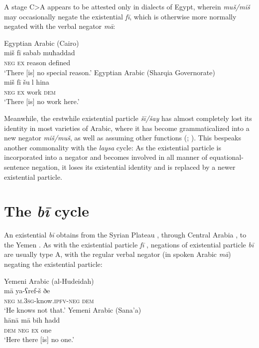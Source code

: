 \documentclass[output=paper]{langsci/langscibook}
\begin{document}
A stage C>A appears to be attested only in dialects of Egypt, wherein \textit{muš/miš} may occasionally negate the existential \textit{fī}, which is otherwise more normally negated with the verbal negator \textit{mā}:

\ea \label{ex:WiAR-21}
  \ea Egyptian Arabic (Cairo)\\
  	\gll miš fī sabab muħaddad\\
  	\textsc{neg} \textsc{ex} reason defined\\
  	\glt ‘There [is] no special reason.’ \citep[89]{doss2008a}
  \ex Egyptian Arabic (Sharqia Governorate)\\
  	\gll miš fī šul hina\\
  	\textsc{neg} \textsc{ex} work \textsc{dem}\\
  	\glt ‘There [is] no work here.’ \citep[71]{h2011a}
\z \z



Meanwhile, the erstwhile existential particle \textit{šī/šay} has almost completely lost its identity in most varieties of Arabic, where it has become grammaticalized into a new negator \textit{miš/muš}, as well as assuming other functions (\citealp[chpt. 3]{wilmsen2014a}; \citealp{wilmsen2017a}). This bespeaks another commonality with the \textit{laysa} cycle: As the existential particle is incorporated into a negator and becomes involved in all manner of equational-sentence negation, it loses its existential identity and is replaced by a newer existential particle. 


\section{The \textit{bī} cycle\footnotemark} \label{s:WiAR-4}


An existential \textit{bī} obtains from the Syrian Plateau \citep[346–348, map 336]{behnstedt1997a}, through Central Arabia \citep[44-45]{ingham1994a}, to the Yemen \citep[346, map 136]{behnstedt2016a}. As with the existential particle \textit{fī} \citep[7]{Croft1991}, negations of existential particle \textit{bī} are usually type A, with the regular verbal negator (in spoken Arabic \textit{mā}) negating the existential particle:

\ea \label{ex:WiAR-22}
  \ea Yemeni Arabic (al-Hudeidah)\\
  	\gll mā ya-ʕref-š ðe\\
  	\textsc{neg} \textsc{m.3sg}-know.\textsc{ipfv-neg} \textsc{dem}\\
  	\glt ‘He knows not that.’ \citep[210]{simeone-senelle1996a}	
  \ex Yemeni Arabic (Sana’a)\\
  	\gll hānā mā bih ħadd\\
  	\textsc{dem} \textsc{neg} \textsc{ex} one\\
  	\glt ‘Here there [is] no one.’ \citep[163]{watson1993a}
\z \z
\end{document}
